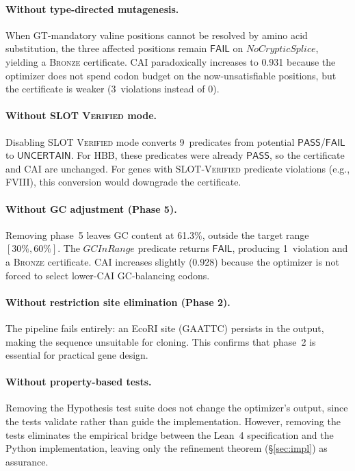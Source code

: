 \documentclass[acmsmall,review,anonymous]{acmart}
\newcommand{\PASS}{\ensuremath{\mathsf{PASS}}\xspace}
\newcommand{\FAIL}{\ensuremath{\mathsf{FAIL}}\xspace}
\newcommand{\UNCERTAIN}{\ensuremath{\mathsf{UNCERTAIN}}\xspace}
\newcommand{\BRONZE}{\textsc{Bronze}\xspace}
\begin{document}
\paragraph{Without type-directed mutagenesis.}
When GT-mandatory valine positions cannot be resolved by amino acid
substitution, the three affected positions remain \FAIL{} on
$\mathit{NoCrypticSplice}$, yielding a \BRONZE{} certificate.  CAI
paradoxically increases to 0.931 because the optimizer does not spend
codon budget on the now-unsatisfiable positions, but the certificate is
weaker (3~violations instead of 0).

\paragraph{Without SLOT \textsc{Verified} mode.}
Disabling SLOT \textsc{Verified} mode converts 9~predicates from
potential \PASS/\FAIL{} to \UNCERTAIN.  For HBB, these predicates were
already \PASS, so the certificate and CAI are unchanged.  For genes with
SLOT-\textsc{Verified} predicate violations (e.g., FVIII), this
conversion would downgrade the certificate.

\paragraph{Without GC adjustment (Phase 5).}
Removing phase~5 leaves GC content at 61.3\%, outside the target range
$[30\%, 60\%]$.  The $\mathit{GCInRange}$ predicate returns \FAIL,
producing 1~violation and a \BRONZE{} certificate.  CAI increases
slightly (0.928) because the optimizer is not forced to select
lower-CAI GC-balancing codons.

\paragraph{Without restriction site elimination (Phase 2).}
The pipeline fails entirely: an EcoRI site (GAATTC) persists in the
output, making the sequence unsuitable for cloning.  This confirms that
phase~2 is essential for practical gene design.

\paragraph{Without property-based tests.}
Removing the Hypothesis test suite does not change the optimizer's
output, since the tests validate rather than guide the implementation.
However, removing the tests eliminates the empirical bridge between the
Lean~4 specification and the Python implementation, leaving only the
refinement theorem (\S\ref{sec:impl}) as assurance.
\end{document}
